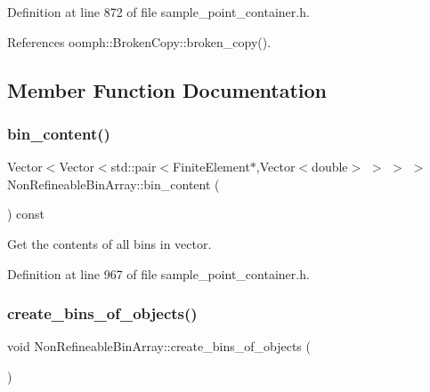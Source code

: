 Definition at line 872 of file sample\+\_\+point\+\_\+container.\+h.



References oomph\+::\+Broken\+Copy\+::broken\+\_\+copy().



\subsection{Member Function Documentation}
\mbox{\label{classNonRefineableBinArray_ab5f0fb40c4211e20cfe927d6eb1206f9}} 
\subsubsection{\texorpdfstring{bin\+\_\+content()}{bin\_content()}}
{\footnotesize\ttfamily Vector$<$Vector$<$std\+::pair$<$Finite\+Element$\ast$,Vector$<$double$>$ $>$ $>$ $>$ Non\+Refineable\+Bin\+Array\+::bin\+\_\+content (\begin{DoxyParamCaption}{ }\end{DoxyParamCaption}) const\hspace{0.3cm}{\ttfamily [inline]}}



Get the contents of all bins in vector. 



Definition at line 967 of file sample\+\_\+point\+\_\+container.\+h.

\mbox{\label{classNonRefineableBinArray_a09b3807d836620c55ad7febdfc81bd93}} 
\subsubsection{\texorpdfstring{create\+\_\+bins\+\_\+of\+\_\+objects()}{create\_bins\_of\_objects()}}
{\footnotesize\ttfamily void Non\+Refineable\+Bin\+Array\+::create\+\_\+bins\+\_\+of\+\_\+objects (\begin{DoxyParamCaption}{ }\end{DoxyParamCaption})\hspace{0.3cm}{\ttfamily [private]}}

